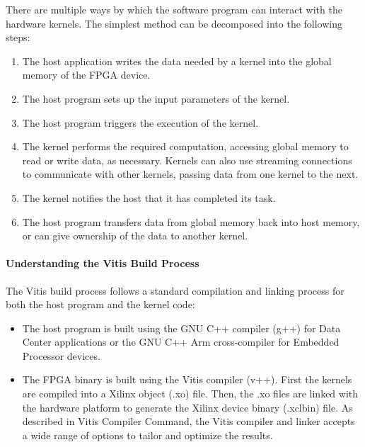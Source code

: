 \par There are multiple ways by which the software program can interact with the hardware kernels. The simplest method can be decomposed into the following steps:

\begin{enumerate}
    \item The host application writes the data needed by a kernel into the global memory of the FPGA device.
    \item The host program sets up the input parameters of the kernel.
    \item The host program triggers the execution of the kernel.
    \item The kernel performs the required computation, accessing global memory to read or write data, as necessary. Kernels can also use streaming connections to communicate with other kernels, passing data from one kernel to the next.
    \item The kernel notifies the host that it has completed its task.
    \item The host program transfers data from global memory back into host memory, or can give ownership of the data to another kernel.
\end{enumerate}

\paragraph{Understanding the Vitis Build Process}
The Vitis build process follows a standard compilation and linking process for both the host program and the kernel code:

\begin{itemize}
    \item  The host program is built using the GNU C++ compiler (g++) for Data Center applications or the GNU C++ Arm cross-compiler for Embedded Processor devices.

    \item The FPGA binary is built using the Vitis compiler (v++). First the kernels are compiled into a Xilinx object (.xo) file. Then, the .xo files are linked with the hardware platform to generate the Xilinx device binary (.xclbin) file. As described in Vitis Compiler Command, the Vitis compiler and linker accepts a wide range of options to tailor and optimize the results.
\end{itemize}


